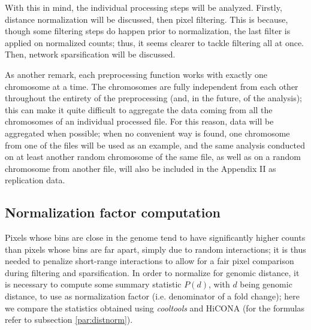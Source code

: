 With this in mind, the individual processing steps will be analyzed. Firstly, distance normalization will be discussed, then pixel filtering. This is because, though some filtering steps do happen prior to normalization, the last filter is applied on normalized counts; thus, it seems clearer to tackle filtering all at once. Then, network sparsification will be discussed. 

As another remark, each preprocessing function works with exactly one chromosome at a time. The chromosomes are fully independent from each other throughout the entirety of the preprocessing (and, in the future, of the analysis); this can make it quite difficult to aggregate the data coming from all the chromosomes of an individual processed file. For this reason, data will be aggregated when possible; when no convenient way is found, one chromosome from one of the files will be used as an example, and the same analysis conducted on at least another random chromosome of the same file, as well as on a random chromosome from another file, will also be included in the Appendix II as replication data.

\subsection{Normalization factor computation}

Pixels whose bins are close in the genome tend to have significantly higher counts than pixels whose bins are far apart, simply due to random interactions; it is thus needed to penalize short-range interactions to allow for a fair pixel comparison during filtering and sparsification. In order to normalize for genomic distance, it is necessary to compute some summary statistic $P(d)$, with $d$ being genomic distance, to use as normalization factor (i.e. denominator of a fold change); here we compare the statistics obtained using \textit{cooltools} and HiCONA (for the formulas refer to subsection \ref{par:distnorm}). 

